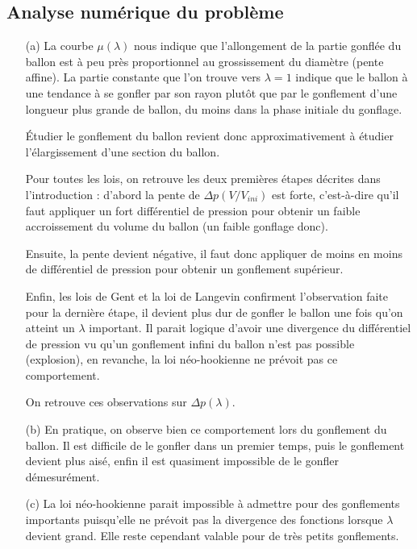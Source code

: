 \documentclass[a4paper,11pt]{article}
\begin{document}
\subsection{Analyse numérique du problème}
\begin{enumerate}
\item[(a)]
La courbe $\mu(\lambda)$ nous indique que l'allongement de la partie gonflée du ballon est à peu près proportionnel au grossissement du diamètre (pente affine). La partie constante que l'on trouve vers $\lambda = 1$ indique que le ballon à une tendance à se gonfler par son rayon plutôt que par le gonflement d'une longueur plus grande de ballon, du moins dans la phase initiale du gonflage.

\hspace{0.8cm} Étudier le gonflement du ballon revient donc approximativement à étudier l'élargissement d'une section du ballon.

\hspace{0.8cm} Pour toutes les lois, on retrouve les deux premières étapes décrites dans l'introduction : d'abord la pente de $\Delta p (V/V_{ini})$ est forte, c'est-à-dire qu'il faut appliquer un fort différentiel de pression pour obtenir un faible accroissement du volume du ballon (un faible gonflage donc).

\hspace{0.8cm}Ensuite, la pente devient négative, il faut donc appliquer de moins en moins de différentiel de pression pour obtenir un gonflement supérieur.

\hspace{0.8cm}Enfin, les lois de Gent et la loi de Langevin confirment l'observation faite pour la dernière étape, il devient plus dur de gonfler le ballon une fois qu'on atteint un $\lambda$ important. Il parait logique d'avoir une divergence du différentiel de pression vu qu'un gonflement infini du ballon n'est pas possible (explosion), en revanche, la loi néo-hookienne ne prévoit pas ce comportement.

On retrouve ces observations sur $\Delta p (\lambda)$.

\item[(b)]
En pratique, on observe bien ce comportement lors du gonflement du ballon. Il est difficile de le gonfler dans un premier temps, puis le gonflement devient plus aisé, enfin il est quasiment impossible de le gonfler démesurément.

\item[(c)]
La loi néo-hookienne parait impossible à admettre pour des gonflements importants puisqu'elle ne prévoit pas la divergence des fonctions lorsque $\lambda$ devient grand. Elle reste cependant valable pour de très petits gonflements.


\end{enumerate}
\end{document}
